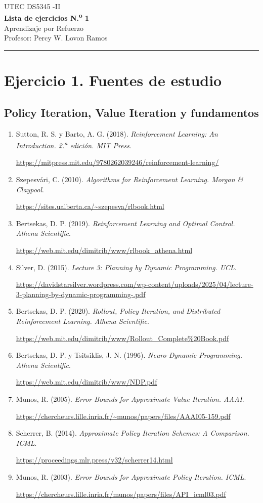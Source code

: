 \documentclass[11pt,a4paper]{article}
\newcommand{\fuente}[4]{\item\label{#1} #2. \textit{#3}.\par{\small\raggedright\url{#4}\par}}
\begin{document}
\begin{center}
{\small UTEC \quad DS5345 -II}\\[0.6em]
{\LARGE\bfseries Lista de ejercicios N.\textsuperscript{o} 1}\\[0.4em]
{\large Aprendizaje por Refuerzo}\\[0.6em]
Profesor: Percy W. Lovon Ramos
\end{center}
\hrule
\vspace{0.5em}

\section{Ejercicio 1. Fuentes de estudio}

\subsection*{Policy Iteration, Value Iteration y fundamentos}
\begin{enumerate}
\renewcommand{\labelenumi}{[\arabic{enumi}]}
\setlength{\itemsep}{0.7em}
\fuente{f:sutton}{Sutton, R. S. y Barto, A. G. (2018)}{Reinforcement Learning: An Introduction. 2.\textsuperscript{a} edición. MIT Press}{https://mitpress.mit.edu/9780262039246/reinforcement-learning/}
\fuente{f:szepesvari}{Szepesvári, C. (2010)}{Algorithms for Reinforcement Learning. Morgan \& Claypool}{https://sites.ualberta.ca/~szepesva/rlbook.html}
\fuente{f:bertsekas}{Bertsekas, D. P. (2019)}{Reinforcement Learning and Optimal Control. Athena Scientific}{https://web.mit.edu/dimitrib/www/rlbook_athena.html}
\fuente{f:silverdp}{Silver, D. (2015)}{Lecture 3: Planning by Dynamic Programming. UCL}{https://davidstarsilver.wordpress.com/wp-content/uploads/2025/04/lecture-3-planning-by-dynamic-programming-.pdf}
\fuente{f:rollout}{Bertsekas, D. P. (2020)}{Rollout, Policy Iteration, and Distributed Reinforcement Learning. Athena Scientific}{https://web.mit.edu/dimitrib/www/Rollout_Complete\%20Book.pdf}
\fuente{f:ndp}{Bertsekas, D. P. y Tsitsiklis, J. N. (1996)}{Neuro-Dynamic Programming. Athena Scientific}{https://web.mit.edu/dimitrib/www/NDP.pdf}
\fuente{f:munosvi}{Munos, R. (2005)}{Error Bounds for Approximate Value Iteration. AAAI}{https://chercheurs.lille.inria.fr/~munos/papers/files/AAAI05-159.pdf}
\fuente{f:scherrer}{Scherrer, B. (2014)}{Approximate Policy Iteration Schemes: A Comparison. ICML}{https://proceedings.mlr.press/v32/scherrer14.html}
\fuente{f:munospi}{Munos, R. (2003)}{Error Bounds for Approximate Policy Iteration. ICML}{https://chercheurs.lille.inria.fr/munos/papers/files/API_icml03.pdf}
\end{enumerate}
\end{document}
